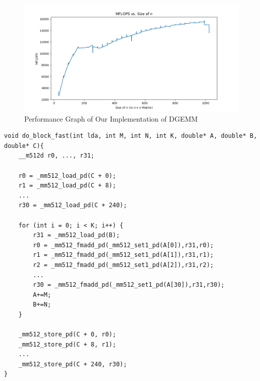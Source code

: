 \documentclass{article}
\begin{document}
\begin{figure}[H]
	\centerline{\includegraphics[width=6in]{figures/MFLOPS.png}}
	\caption{Performance Graph of Our Implementation of DGEMM}
	\label{fig:our-dgemm}
\end{figure}

\label{Alg-2}
\begin{verbatim}
void do_block_fast(int lda, int M, int N, int K, double* A, double* B, double* C){
    __m512d r0, ..., r31;
    
    r0 = _mm512_load_pd(C + 0);
    r1 = _mm512_load_pd(C + 8);
    ...
    r30 = _mm512_load_pd(C + 240);

    for (int i = 0; i < K; i++) {
        r31 = _mm512_load_pd(B);
        r0 = _mm512_fmadd_pd(_mm512_set1_pd(A[0]),r31,r0);
        r1 = _mm512_fmadd_pd(_mm512_set1_pd(A[1]),r31,r1);
        r2 = _mm512_fmadd_pd(_mm512_set1_pd(A[2]),r31,r2);
        ...
        r30 = _mm512_fmadd_pd(_mm512_set1_pd(A[30]),r31,r30);
        A+=M;
        B+=N;
    }

    _mm512_store_pd(C + 0, r0);
    _mm512_store_pd(C + 8, r1);
    ...
    _mm512_store_pd(C + 240, r30);
}
\end{verbatim}
\end{document}
